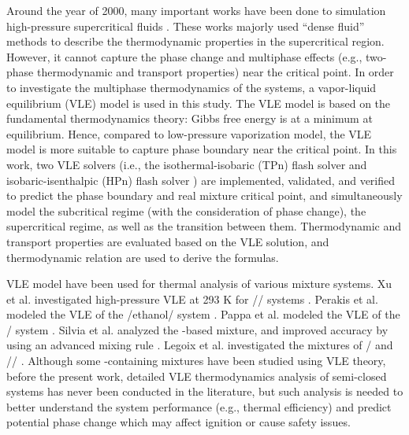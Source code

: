 Around the year of 2000, many important works have been done to simulation high-pressure supercritical fluids \cite{oefelein2005thermophysical,bellan2000supercritical,yang2000modeling}. These works majorly used ``dense fluid'' methods to describe the thermodynamic properties in the supercritical region. However, it cannot capture the phase change and multiphase effects (e.g., two-phase thermodynamic and transport properties) near the critical point.
In order to investigate the multiphase thermodynamics of the  systems, a vapor-liquid equilibrium (VLE) model \cite{michelsen1982isothermal,michelsen1987multiphase} is used in this study. The VLE model is based on the fundamental thermodynamics theory: Gibbs free energy is at a minimum at equilibrium. Hence, compared to low-pressure vaporization model, the VLE model is more suitable to capture phase boundary near the critical point. In this work, two VLE solvers (i.e., the isothermal-isobaric (TPn) flash solver \cite{michelsen1982isothermal} and isobaric-isenthalpic (HPn) flash solver \cite{michelsen1987multiphase}) are implemented, validated, and verified to predict the phase boundary and real mixture critical point, and simultaneously model the subcritical regime (with the consideration of phase change), the supercritical regime, as well as the transition between them. Thermodynamic and transport properties are evaluated based on the VLE solution, and thermodynamic relation are used to derive the formulas.

VLE model have been used for thermal analysis of various mixture systems. Xu et al. investigated high-pressure VLE at 293 K for // systems \cite{xu1992high}. Perakis et al. modeled the VLE of the /ethanol/ system \cite{perakis2006thermodynamic}. Pappa et al. modeled the VLE of the / system \cite{pappa2009thermodynamic}. Silvia et al. analyzed the -based mixture, and improved accuracy by using an advanced mixing rule \cite{lasala2016vle}. Legoix et al. investigated the mixtures of / and // \cite{legoix2017phase}. Although some -containing mixtures have been studied using VLE theory, before the present work, detailed VLE thermodynamics analysis of semi-closed  systems has never been conducted in the literature, but such analysis is needed to better understand the  system performance (e.g., thermal efficiency) and predict potential phase change which may affect ignition or cause safety issues.

